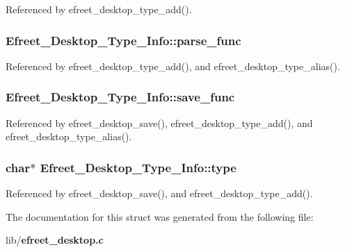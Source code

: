 Referenced by efreet\_\-desktop\_\-type\_\-add().
\subsubsection{ {\bf Efreet\_\-Desktop\_\-Type\_\-Info::parse\_\-func}}\label{structEfreet__Desktop__Type__Info_62e3cdf35b73ff0300a53fec1279bee3}




Referenced by efreet\_\-desktop\_\-type\_\-add(), and efreet\_\-desktop\_\-type\_\-alias().
\subsubsection{ {\bf Efreet\_\-Desktop\_\-Type\_\-Info::save\_\-func}}\label{structEfreet__Desktop__Type__Info_9d27f050bca046b65433c43c94d04c0b}




Referenced by efreet\_\-desktop\_\-save(), efreet\_\-desktop\_\-type\_\-add(), and efreet\_\-desktop\_\-type\_\-alias().
\subsubsection{\setlength{\rightskip}{0pt plus 5cm}char$\ast$ {\bf Efreet\_\-Desktop\_\-Type\_\-Info::type}}\label{structEfreet__Desktop__Type__Info_7828dc765e6e1b8a7be3fc0b9d6b59f2}




Referenced by efreet\_\-desktop\_\-save(), and efreet\_\-desktop\_\-type\_\-add().

The documentation for this struct was generated from the following file:\begin{CompactItemize}
\item 
lib/{\bf efreet\_\-desktop.c}\end{CompactItemize}
